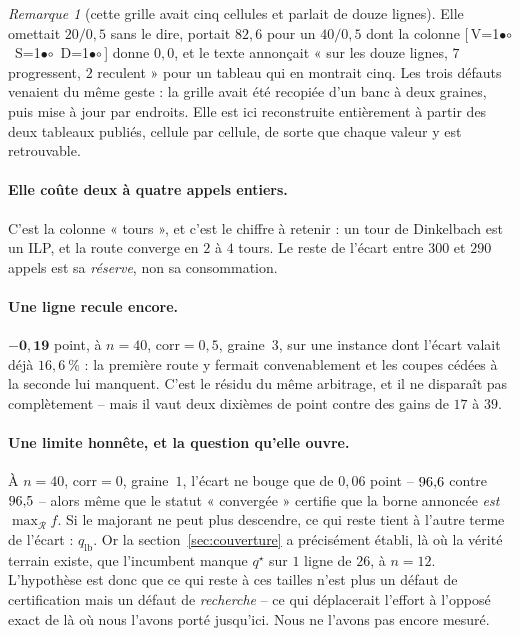 \documentclass[11pt,a4paper]{article}
\theoremstyle{plain}
\theoremstyle{remark}
\newtheorem{remark}{Remarque}
\newcommand{\Rcal}{\mathcal{R}}
\newcommand{\qs}{q^{\star}}
\newcommand{\cfgm}[1]{\ifnum#1=1$\bullet$\else$\circ$\fi}
\newcommand{\conf}[3]{%
  \textsf{\footnotesize[\,V\cfgm{#1}\ S\cfgm{#2}\ D\cfgm{#3}\,]}}
\begin{document}
\begin{remark}[cette grille avait cinq cellules et parlait de douze lignes]
Elle omettait $20/0{,}5$ sans le dire, portait $82{,}6$ pour un
$40/0{,}5$ dont la colonne \conf{0}{0}{0} donne $0{,}0$, et le texte
annonçait « sur les douze lignes, $7$ progressent, $2$ reculent » pour un
tableau qui en montrait cinq. Les trois défauts venaient du même geste :
la grille avait été recopiée d'un banc à deux graines, puis mise à jour
par endroits. Elle est ici reconstruite entièrement à partir des deux
tableaux publiés, cellule par cellule, de sorte que chaque valeur y est
retrouvable.
\end{remark}

\paragraph{Elle coûte deux à quatre appels entiers.} C'est la colonne
« tours », et c'est le chiffre à retenir : un tour de Dinkelbach est un ILP,
et la route converge en $2$ à $4$ tours. Le reste de l'écart entre $300$ et
$290$ appels est sa \emph{réserve}, non sa consommation.

\paragraph{Une ligne recule encore.} $\mathbf{-0{,}19}$ point, à $n=40$,
$\text{corr}=0{,}5$, graine~$3$, sur une instance dont l'écart valait déjà
$16{,}6\ \%$ : la première route y fermait convenablement et les coupes
cédées à la seconde lui manquent. C'est le résidu du même arbitrage, et il
ne disparaît pas complètement -- mais il vaut deux dixièmes de point contre
des gains de $17$ à $39$.

\paragraph{Une limite honnête, et la question qu'elle ouvre.} À $n=40$,
$\text{corr}=0$, graine~$1$, l'écart ne bouge que de $0{,}06$ point --
$96{,}6{}$ contre $96{,}5{}$ -- alors même que le statut « convergée » certifie
que la borne annoncée \emph{est} $\max_{\Rcal}f$. Si le majorant ne peut
plus descendre, ce qui reste tient à l'autre terme de l'écart :
$q_{\text{lb}}$. Or la section~\ref{sec:couverture} a précisément établi, là
où la vérité terrain existe, que l'incumbent manque $\qs$ sur $1$ ligne de
$26$, à $n=12$. L'hypothèse est donc que ce qui reste à ces
tailles n'est plus un défaut de certification mais un défaut de
\emph{recherche} -- ce qui déplacerait l'effort à l'opposé exact de là où
nous l'avons porté jusqu'ici. Nous ne l'avons pas encore mesuré.
\end{document}
